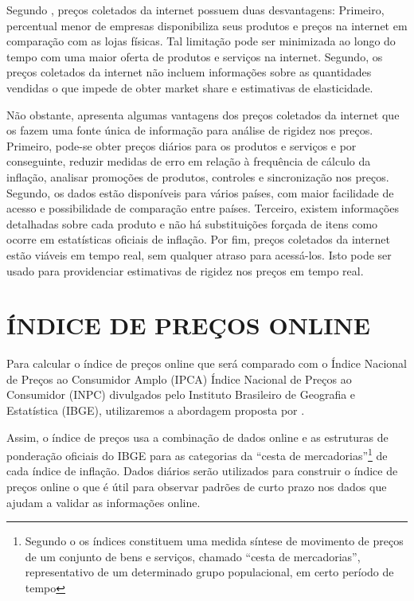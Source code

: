 \documentclass[twoside,a4paper,12pt]{report}
\begin{document}
Segundo \citet{cavallo2010scraped}, preços coletados da internet possuem duas desvantagens: Primeiro, percentual menor de empresas disponibiliza seus produtos e preços na internet em comparação com as lojas físicas. Tal limitação pode ser minimizada ao longo do tempo com uma maior oferta de produtos e serviços na internet. Segundo, os preços coletados da internet não incluem informações sobre as quantidades vendidas o que impede de obter market share e estimativas de elasticidade.

  Não obstante, \citet{cavallo2010scraped} apresenta algumas vantagens dos preços coletados da internet que os fazem uma fonte única de informação para análise de rigidez nos preços. Primeiro, pode-se obter preços diários para os produtos e serviços e por conseguinte, reduzir medidas de erro em relação à frequência de cálculo da inflação, analisar promoções de produtos, controles e sincronização nos preços. Segundo, os dados estão disponíveis para vários países, com maior facilidade de acesso e possibilidade de comparação entre países. Terceiro, existem informações detalhadas sobre cada produto e não há substituições forçada de itens como ocorre em estatísticas oficiais de inflação. Por fim, preços coletados da internet estão viáveis em tempo real, sem qualquer atraso para acessá-los. Isto pode ser usado para providenciar estimativas de rigidez nos preços em tempo real.
  
\section*{ÍNDICE DE PREÇOS ONLINE}
  
  Para calcular o índice de preços online que será comparado com o Índice Nacional de Preços ao Consumidor Amplo (IPCA) Índice Nacional de Preços ao Consumidor (INPC) divulgados pelo Instituto Brasileiro de Geografia e Estatística (IBGE), utilizaremos a abordagem proposta por \citet{cavallo2010scraped}.
  
  Assim, o índice de preços usa a combinação de dados online e as estruturas de ponderação oficiais do IBGE para as categorias da “cesta de mercadorias”\footnote[1]{Segundo o \citet{ibgemetodos} os índices constituem uma medida síntese de movimento de preços de um conjunto de bens e serviços, chamado “cesta de mercadorias”, representativo de um determinado grupo populacional, em certo período de tempo} de cada índice de inflação. Dados diários serão utilizados para construir o índice de preços online o que é útil para observar padrões de curto prazo nos dados que ajudam a validar as informações online. 
  
\end{document}
